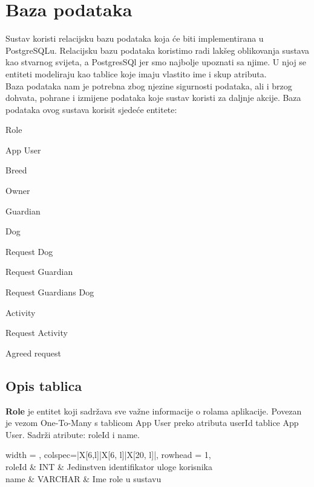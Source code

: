 		
		

	
		

		
		\eject
				
		\section{Baza podataka}
			
			Sustav koristi relacijsku bazu podataka koja će biti implementirana u PostgreSQLu. Relacijsku bazu podataka koristimo radi lakšeg oblikovanja sustava kao stvarnog svijeta, a PostgresSQl jer smo najbolje upoznati sa njime. U njoj se entiteti modeliraju kao tablice koje imaju vlastito ime i skup atributa.\\
			Baza podataka nam je potrebna zbog njezine sigurnosti podataka, ali i brzog dohvata, pohrane i izmijene podataka koje sustav koristi za daljnje akcije.
			Baza podataka ovog sustava korisit sjedeće entitete:
			\begin{packed_item}
				\item Role
				\item App User
				\item Breed
				\item Owner
				\item Guardian
				\item Dog
				\item Request Dog
				\item Request Guardian
				\item Request Guardians Dog
				\item Activity
				\item Request Activity
				\item Agreed request
				
			\end{packed_item}
			
		
			\subsection{Opis tablica}
			
			
			\textbf{Role} je entitet koji sadržava sve važne informacije o rolama aplikacije. Povezan je vezom One-To-Many s tablicom App User preko atributa userId tablice App User. Sadrži atribute: roleId i name.
			
			
			
			
			\begin{longtblr}[
				label=none,
				entry=none
				]{
					width = \textwidth,
					colspec={|X[6,l]|X[6, l]|X[20, l]|}, 
					rowhead = 1,
				} %
				\hline {}	 \\ \hline[3pt]
				roleId	& INT &  Jedinstven identifikator uloge korisnika 	\\ \hline
				name & VARCHAR &  Ime role u sustavu \\ \hline
			 
			\end{longtblr}
			
